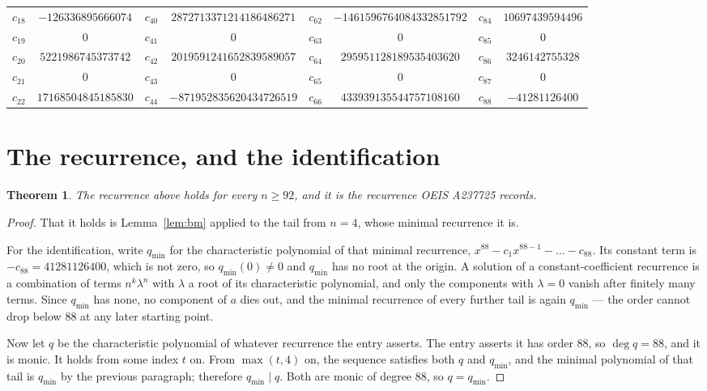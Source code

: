 \documentclass[11pt,a4paper]{article}
\theoremstyle{plain}
\newtheorem{theorem}{Theorem}
\theoremstyle{definition}
\begin{document}
\begin{center}
\begin{tabular}{cccccccc}
$c_{18}$ & $-126336895666074$ & $c_{40}$ & $2872713371214186486271$ & $c_{62}$ & $-1461596764084332851792$ & $c_{84}$ & $10697439594496$ \\
$c_{19}$ & $0$ & $c_{41}$ & $0$ & $c_{63}$ & $0$ & $c_{85}$ & $0$ \\
$c_{20}$ & $5221986745373742$ & $c_{42}$ & $2019591241652839589057$ & $c_{64}$ & $295951128189535403620$ & $c_{86}$ & $3246142755328$ \\
$c_{21}$ & $0$ & $c_{43}$ & $0$ & $c_{65}$ & $0$ & $c_{87}$ & $0$ \\
$c_{22}$ & $17168504845185830$ & $c_{44}$ & $-871952835620434726519$ & $c_{66}$ & $433939135544757108160$ & $c_{88}$ & $-41281126400$ \\
\end{tabular}
\end{center}

\section{The recurrence, and the identification}

\begin{theorem}
The recurrence above holds for every $n\ge92$, and it is the recurrence OEIS A237725 records.
\end{theorem}

\begin{proof}
That it holds is Lemma~\ref{lem:bm} applied to the tail from $n=4$, whose minimal
recurrence it is.

For the identification, write $q_{\min}$ for the characteristic polynomial of that minimal
recurrence, $x^{88}-c_1x^{88-1}-\dots-c_{88}$. Its constant term is
$-c_{88}=41281126400$, which is not zero, so $q_{\min}(0)\neq0$ and $q_{\min}$ has no
root at the origin. A solution of a constant-coefficient recurrence is a combination of terms
$n^{k}\lambda^{n}$ with $\lambda$ a root of its characteristic polynomial, and only the
components with $\lambda=0$ vanish after finitely many terms. Since $q_{\min}$ has none, no
component of $a$ dies out, and the minimal recurrence of every further tail is again
$q_{\min}$ --- the order cannot drop below $88$ at any later starting point.

Now let $q$ be the characteristic polynomial of whatever recurrence the entry asserts. The
entry asserts it has order $88$, so $\deg q=88$, and it is monic. It holds from some
index $t$ on. From $\max(t,4)$ on, the sequence satisfies both $q$ and $q_{\min}$, and
the minimal polynomial of that tail is $q_{\min}$ by the previous paragraph; therefore
$q_{\min}\mid q$. Both are monic of degree $88$, so $q=q_{\min}$.
\end{proof}
\end{document}
